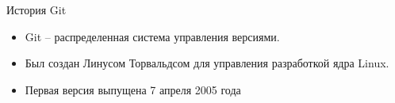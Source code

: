 \begin{frame}{История Git}
    \begin{itemize}
        \item
              Git -- распределенная система управления версиями.
        \item
              Был создан Линусом Торвальдсом для управления разработкой ядра Linux.
        \item
              Первая версия выпущена 7 апреля 2005 года
    \end{itemize}
\end{frame}